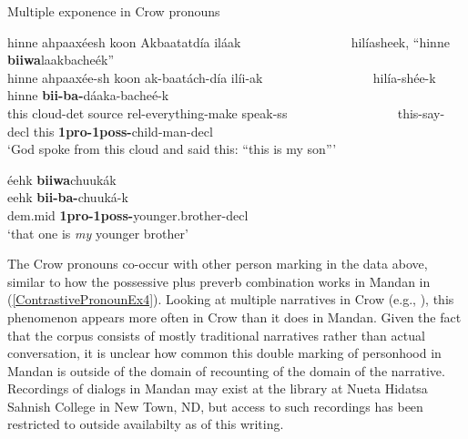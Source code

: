 \begin{exe}

\item\label{MultipleExponenceInCrow} Multiple exponence in Crow pronouns

    \begin{xlist}
    
    \item\label{MultipleExponenceInCrow1} \glll hinne ahpaaxéesh koon Akbaatatdía iláak ~ ~ ~ ~ ~ ~ ~ ~ ~ ~ hilíasheek, ``hinne \textbf{biiwa}laakbacheék''\\
    hinne ahpaaxée-sh koon ak-baatách-día ilíi-ak ~ ~ ~ ~ ~ ~ ~ ~ ~ ~ hilía-shée-k hinne \textbf{bii-ba-}dáaka-bacheé-k\\
    \textnormal{this} \textnormal{cloud}-det \textnormal{source} rel-\textnormal{everything}-\textnormal{make} \textnormal{speak}-ss ~ ~ ~ ~ ~ ~ ~ ~ ~ ~ \textnormal{this}-\textnormal{say}-decl \textnormal{this} \textbf{1pro-1poss-}\textnormal{child}-\textnormal{man}-decl\\
    \glt `God spoke from this cloud and said this: ``this is my son{''}' \citep[61]{graczyk2007}
    
    \item\label{MultipleExponenceInCrow2} \glll éehk \textbf{biiwa}chuukák\\
    eehk \textbf{bii-ba-}chuuká-k\\
    dem.mid \textbf{1pro-1poss-}\textnormal{younger.brother}-decl\\
    \glt `that one is \textit{my} younger brother' \citep[61]{graczyk2007}
    
    \end{xlist}

\end{exe}

The Crow pronouns co-occur with other person marking in the data above, similar to how the possessive plus preverb combination works in Mandan in (\ref{ContrastivePronounEx4}). Looking at multiple narratives in Crow (e.g., \citealt{medicinehorse1986}), this phenomenon appears more often in Crow than it does in Mandan. Given the fact that the corpus consists of mostly traditional narratives rather than actual conversation, it is unclear how common this double marking of personhood in Mandan is outside of the domain of recounting of the domain of the narrative. Recordings of dialogs in Mandan may exist at the library at Nueta Hidatsa Sahnish College in New Town, ND, but access to such recordings has been restricted to outside availabilty as of this writing.

